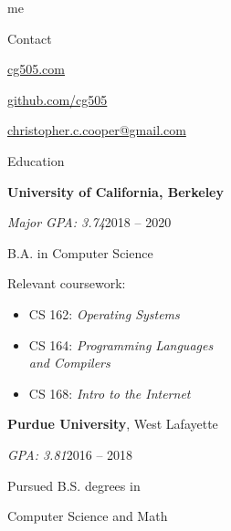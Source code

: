 \begin{minipage}[t]{0.305\textwidth}
  {\Huge me \phantom{my work}}

  \vspace{10pt}

  {\sectionfont Contact}
  \vspace{5pt}
  \begin{adjustwidth}{10pt}{}
    \href{https://cg505.com/}{cg505.com}

    \href{https://github.com/cg505/}{github.com/cg505}


    \href{mailto:christopher.c.cooper@gmail.com}{christopher.c.cooper@gmail.com}
  \end{adjustwidth}

  \vspace{10pt}

  {\sectionfont Education}

  \vspace{5pt}
  \textbf{University of California, Berkeley}%
  \vspace{2pt}
  \begin{adjustwidth}{10pt}{}
   \emph{Major GPA: 3.74}\hfill{}2018 -- 2020

    B.A. in Computer Science

    Relevant coursework:
    \begin{itemize}[leftmargin=*]
    \item CS 162: \emph{Operating Systems}
    \item CS 164: \emph{Programming Languages}\\\phantom{CS 164: }\emph{and Compilers}
    \item CS 168: \emph{Intro to the Internet}
    \end{itemize}
  \end{adjustwidth}

  \vspace{5pt}
  \textbf{Purdue University}, West Lafayette
  \vspace{2pt}
  \begin{adjustwidth}{10pt}{}
    \emph{GPA: 3.81}\hfill{}2016 -- 2018

    Pursued B.S. degrees in

    \enskip Computer Science and Math



\end{adjustwidth}
\end{minipage}
